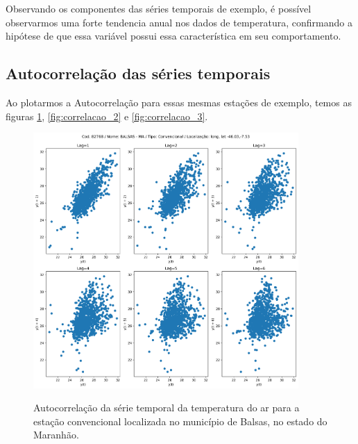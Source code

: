 Observando os componentes das séries temporais de exemplo, é possível observarmos uma forte tendencia anual nos dados de temperatura, confirmando a hipótese de que essa variável possui essa característica em seu comportamento.

\subsection{Autocorrelação das séries temporais}

Ao plotarmos a Autocorrelação para essas mesmas estações de exemplo, temos as figuras \ref{fig:correlacao_1}, \ref{fig:correlacao_2} e \ref{fig:correlacao_3}. 

\begin{figure}[H]
    \centering
    \caption{Autocorrelação da série temporal da temperatura do ar para a estação convencional localizada no município de Balsas, no estado do Maranhão.}
    \includegraphics[width=0.9\textwidth]{figuras/correlacao_82768.png}
    \label{fig:correlacao_1}
\end{figure}

